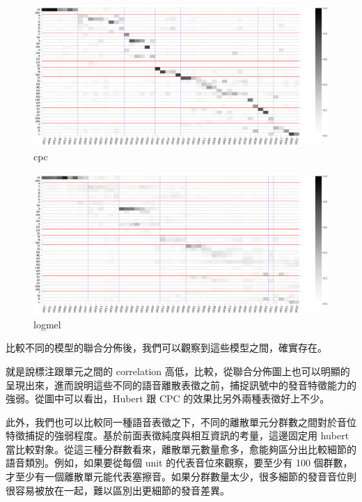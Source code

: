 \begin{figure}
    \centering
    \includegraphics[width=1\linewidth]{figures/cpc50.png}
    \caption{cpc}
    \label{fig:enter-label}
\end{figure}

\begin{figure}
    \centering
    \includegraphics[width=1\linewidth]{figures/logmel50.png}
    \caption{logmel}
    \label{fig:enter-label}
\end{figure}

        比較不同的模型的聯合分佈後，我們可以觀察到這些模型之間，確實存在。

        就是說標注跟單元之間的 correlation 高低，比較，從聯合分佈圖上也可以明顯的呈現出來，進而說明這些不同的語音離散表徵之前，捕捉訊號中的發音特徵能力的強弱。從圖中可以看出，Hubert 跟 CPC 的效果比另外兩種表徵好上不少。

        此外，我們也可以比較同一種語音表徵之下，不同的離散單元分群數之間對於音位特徵捕捉的強弱程度。基於前面表徵純度與相互資訊的考量，這邊固定用 hubert 當比較對象。從這三種分群數看來，離散單元數量愈多，愈能夠區分出比較細節的語音類別。例如，如果要從每個 unit 的代表音位來觀察，要至少有 100 個群數，才至少有一個離散單元能代表塞擦音。如果分群數量太少，很多細節的發音音位則很容易被放在一起，難以區別出更細節的發音差異。

